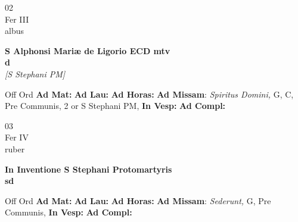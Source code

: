 \documentclass[10pt, openany]{book}
\begin{document}
        \begin{center}
            \begin{minipage}{3.5in}
                \vspace{2em}
                \begin{minipage}{0.5in}
                    {\Huge 02} \\
                    {\normalsize Fer III} \\
                    {\normalsize albus}
                \end{minipage}
                \begin{minipage}{3.0in}
                    \textbf{ \large S Alphonsi Mariæ de Ligorio ECD mtv \\
                    \textnormal{\normalsize d}} \\ \textit{[S Stephani PM]} \\ 
                \end{minipage}
                \begin{justify}Off Ord
                    \textbf{Ad Mat: }
                    \textbf{Ad Lau: }
                    \textbf{Ad Horas: }\textbf{Ad Missam}: \textit{Spiritus Domini,} G, C, Pre Communis, 2 or S Stephani PM,  
                    \textbf{In Vesp: }
                    \textbf{Ad Compl: }
                \end{justify}
            \end{minipage}
        \end{center}
    
        \begin{center}
            \begin{minipage}{3.5in}
                \vspace{2em}
                \begin{minipage}{0.5in}
                    {\Huge 03} \\
                    {\normalsize Fer IV} \\
                    {\normalsize ruber}
                \end{minipage}
                \begin{minipage}{3.0in}
                    \textbf{ \large In Inventione S Stephani Protomartyris \\
                    \textnormal{\normalsize sd}} \\ 
                \end{minipage}
                \begin{justify}Off Ord
                    \textbf{Ad Mat: }
                    \textbf{Ad Lau: }
                    \textbf{Ad Horas: }\textbf{Ad Missam}: \textit{Sederunt,} G, Pre Communis,  
                    \textbf{In Vesp: }
                    \textbf{Ad Compl: }
                \end{justify}
            \end{minipage}
        \end{center}
    
\end{document}
